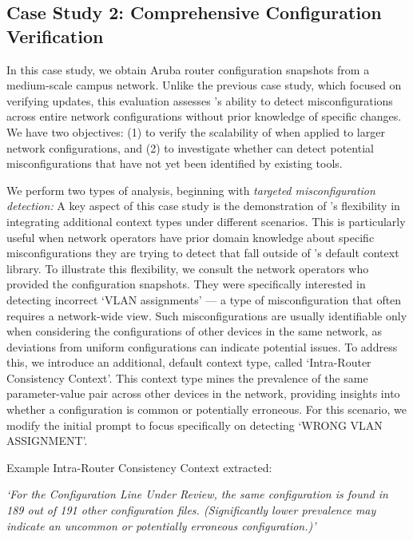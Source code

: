 \subsection{Case Study 2: Comprehensive Configuration Verification}
In this case study, we obtain
Aruba router configuration snapshots from a medium-scale campus network.
Unlike the previous case study, which focused on verifying updates, this evaluation assesses \sysname{}'s ability to detect misconfigurations across entire network configurations without prior knowledge of specific changes.
We
have two objectives: (1) to verify the scalability of \sysname{} when applied to larger network configurations, and (2) to investigate whether \sysname{} can detect potential misconfigurations that have not yet been identified by existing tools.

We perform two types of analysis, beginning with \textit{targeted misconfiguration detection:} A key aspect of this case study is the demonstration of \sysname{}'s flexibility in integrating additional context types under different scenarios. This is particularly useful when network operators have prior domain knowledge about specific misconfigurations they are trying to detect that fall outside of \sysname{}'s default context library.
To illustrate this flexibility, we consult the network operators who provided the configuration snapshots. They were specifically interested in detecting incorrect `VLAN assignments' --- a type of misconfiguration that often requires a network-wide view. Such misconfigurations are usually identifiable only when considering the configurations of other devices in the same network, as deviations from uniform configurations can indicate potential issues.
To address this, we introduce an additional, default context type, called `Intra-Router Consistency Context'.  This context type mines  the prevalence of the same parameter-value pair across other devices in the network, providing insights into whether a configuration is common or potentially erroneous. For this scenario, we modify the initial prompt to focus specifically on detecting `WRONG VLAN ASSIGNMENT'.

Example Intra-Router Consistency Context extracted:

\textit{`For the Configuration Line Under Review, the same configuration is found in 189 out of 191 other configuration files. (Significantly lower prevalence may indicate an uncommon or potentially erroneous configuration.)'}

